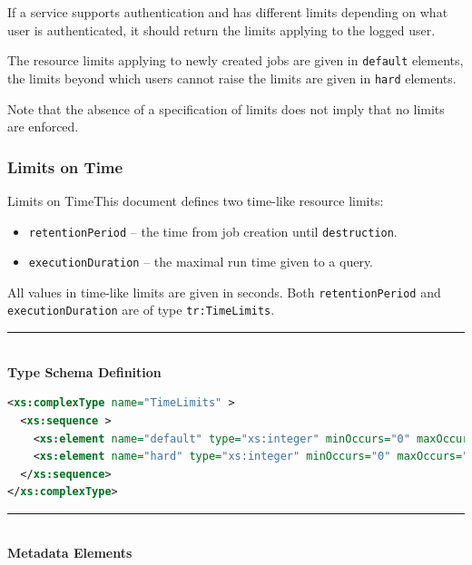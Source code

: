 \documentclass{ivoa}
\begin{document}
If a service supports authentication and has different
limits depending on what user is authenticated, it should return the
limits applying to the logged user.

The resource limits applying to newly created jobs are given in
\texttt{default} elements, the limits beyond which users cannot
raise the limits are given in \texttt{hard} elements.

Note that the absence of a specification of limits does not imply that
no limits are enforced.


\subsubsection{Limits on Time}
Limits on TimeThis document defines two time-like resource limits:


\begin{itemize}

\item \texttt{retentionPeriod} -- the time from job creation until
		\texttt{destruction}.{}

\item \texttt{executionDuration} -- the maximal run time given to
		a query.{}

\end{itemize}
All values in time-like limits are given in seconds.  Both 
\texttt{retentionPeriod} and \texttt{executionDuration} are of type
\texttt{tr:TimeLimits}.

\noindent\rule[-2pt]{\textwidth}{0.5pt}\\
			\textbf{ Type Schema Definition}

\begin{lstlisting}[language=XML]
<xs:complexType name="TimeLimits" >
  <xs:sequence >
    <xs:element name="default" type="xs:integer" minOccurs="0" maxOccurs="1" />
    <xs:element name="hard" type="xs:integer" minOccurs="0" maxOccurs="1" />
  </xs:sequence>
</xs:complexType>
\end{lstlisting}

\noindent\rule[-2pt]{\textwidth}{0.5pt}\\
					\textbf{ Metadata Elements}
\end{document}
